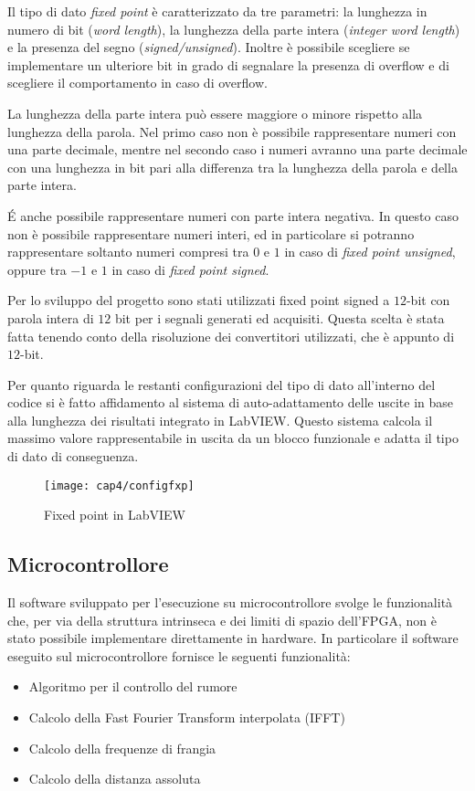 Il tipo di dato \textit{fixed point} è caratterizzato da tre parametri: la lunghezza in numero di bit (\textit{word length}), la lunghezza della parte intera (\textit{integer word length}) e la presenza del segno (\textit{signed/unsigned}). Inoltre è possibile scegliere se implementare un ulteriore bit in grado di segnalare la presenza di overflow e di scegliere il comportamento in caso di overflow.

La lunghezza della parte intera può essere maggiore o minore rispetto alla lunghezza della parola. Nel primo caso non è possibile rappresentare numeri con una parte decimale, mentre nel secondo caso i numeri avranno una parte decimale con una lunghezza in bit pari alla differenza tra la lunghezza della parola e della parte intera. 

\'E anche possibile rappresentare numeri con parte intera negativa. In questo caso non è possibile rappresentare numeri interi, ed in particolare si potranno rappresentare soltanto numeri compresi tra $0$ e $1$ in caso di \textit{fixed point unsigned}, oppure tra $-1$ e $1$ in caso di \textit{fixed point signed}.

Per lo sviluppo del progetto sono stati utilizzati fixed point signed a $12$-bit con parola intera di $12$ bit per i segnali generati ed acquisiti. Questa scelta è stata fatta tenendo conto della risoluzione dei convertitori utilizzati, che è appunto di $12$-bit.

Per quanto riguarda le restanti configurazioni del tipo di dato all'interno del codice si è fatto affidamento al sistema di auto-adattamento delle uscite in base alla lunghezza dei risultati integrato in LabVIEW. Questo sistema calcola il massimo valore rappresentabile in uscita da un blocco funzionale e adatta il tipo di dato di conseguenza.

\begin{figure}  
  \begin{center}
    \texttt{[image: cap4/configfxp]}
    \caption{Fixed point in LabVIEW}
    \label{configfxp}
  \end{center}
\end{figure}

\subsection{Microcontrollore}
Il software sviluppato per l'esecuzione su microcontrollore svolge le funzionalità che, per via della struttura intrinseca e dei limiti di spazio dell'FPGA, non è stato possibile implementare direttamente in hardware. In particolare il software eseguito sul microcontrollore fornisce le seguenti funzionalità:
\begin{itemize}
	\item Algoritmo per il controllo del rumore
	\item Calcolo della Fast Fourier Transform interpolata (IFFT)
	\item Calcolo della frequenze di frangia
	\item Calcolo della distanza assoluta
\end{itemize}

